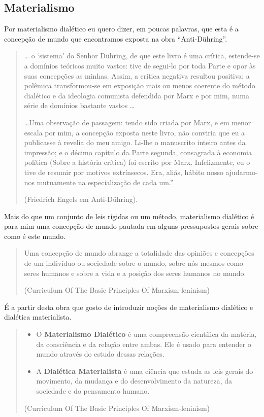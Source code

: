 \subsection{Materialismo}

Por materialismo dialético eu quero dizer, em poucas palavras, que esta é a concepção de mundo que encontramos exposta na obra “Anti-Dühring”.

\begin{quote}
… o ‘sistema’ do Senhor Dühring, de que este livro é uma crítica, estende-se a domínios teóricos muito vastos: tive de segui-lo por toda Parte e opor às suas concepções as minhas. Assim, a crítica negativa resultou positiva; a polêmica transformou-se em exposição mais ou menos coerente do método dialético e da ideologia comunista defendida por Marx e por mim, numa série de domínios bastante vastos …

…Uma observação de passagem: tendo sido criada por Marx, e em menor escala por mim, a concepção exposta neste livro, não conviria que eu a publicasse à revelia do meu amigo. Li-lhe o manuscrito inteiro antes da impressão; e o décimo capítulo da Parte segunda, consagrada à economia política (Sobre a história crítica) foi escrito por Marx. Infelizmente, eu o tive de resumir por motivos extrínsecos. Era, aliás, hábito nosso ajudarmo-nos mutuamente na especialização de cada um.”

(Friedrich Engels em Anti-Dühring).
\end{quote}

Mais do que um conjunto de leis rígidas ou um método, materialismo dialético é para mim uma concepção de mundo pautada em alguns pressupostos gerais sobre como é este mundo.

\begin{quote}
Uma concepção de mundo abrange a totalidade das opiniões e concepções de um indivíduo ou sociedade sobre o mundo, sobre nós mesmos como seres humanos e sobre a vida e a posição dos seres humanos no mundo.

(Curriculum Of The Basic Principles Of Marxism-leninism)
\end{quote}

É a partir desta obra que gosto de introduzir noções de materialismo dialético e dialética materialista.

\begin{quote}
\begin{itemize}
\item O \textbf{Materialismo Dialético} é uma compreensão científica da matéria, da consciência e da relação entre ambas. Ele é usado para entender o mundo através do estudo dessas relações.

\item A \textbf{Dialética Materialista} é uma ciência que estuda as leis gerais do movimento, da mudança e do desenvolvimento da natureza, da sociedade e do pensamento humano.
\end{itemize}
(Curriculum Of The Basic Principles Of Marxism-leninism)
\end{quote}


